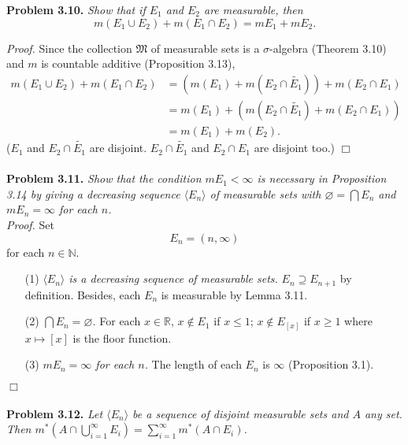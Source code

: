 \documentclass{article}
\begin{document}
\textbf{Problem 3.10.}
\emph{Show that if $E_1$ and $E_2$ are measurable, then
$$m(E_1 \cup E_2) + m(E_1 \cap E_2) = mE_1 + mE_2.$$}

\emph{Proof.}
Since the collection $\mathfrak{M}$ of measurable sets is a $\sigma$-algebra
(Theorem 3.10) and $m$ is countable additive (Proposition 3.13),
\begin{align*}
m(E_1 \cup E_2) + m(E_1 \cap E_2)
& = \left( m(E_1) + m(E_2 \cap \widetilde{E_1}) \right) + m(E_2 \cap E_1) \\
& = m(E_1) + \left( m(E_2 \cap \widetilde{E_1}) + m(E_2 \cap E_1) \right) \\
& = m(E_1) + m(E_2).
\end{align*}
($E_1$ and $E_2 \cap \widetilde{E_1}$ are disjoint.
$E_2 \cap \widetilde{E_1}$ and $E_2 \cap E_1$ are disjoint too.)
$\Box$ \\\\



\textbf{Problem 3.11.}
\emph{Show that the condition $mE_1 < \infty$ is necessary in Proposition 3.14 by
giving a decreasing sequence $\langle E_n \rangle$ of measurable sets with
$\varnothing = \bigcap E_n$ and $mE_n = \infty$ for each $n$.} \\

\emph{Proof.}
Set $$E_n = (n, \infty)$$ for each $n \in \mathbb{N}$.
\begin{enumerate}
\item[(1)]
\emph{$\langle E_n \rangle$ is a decreasing sequence of measurable sets.}
$E_n \supseteq E_{n+1}$ by definition.
Besides, each $E_n$ is measurable by Lemma 3.11.
\item[(2)]
\emph{$\bigcap E_n = \varnothing$.}
For each $x \in \mathbb{R}$, $x \notin E_1$ if $x \leq 1$;
$x \notin E_{[x]}$ if $x \geq 1$ where $x \mapsto [x]$ is the floor function.
\item[(3)]
\emph{$mE_n = \infty$ for each $n$.}
The length of each $E_n$ is $\infty$ (Proposition 3.1).
\end{enumerate}
$\Box$ \\\\



\textbf{Problem 3.12.}
\emph{Let $\langle E_n \rangle$ be a sequence of disjoint measurable sets and $A$ any set.
Then
$m^{*}\left( A \cap \bigcup_{i=1}^{\infty}E_i \right)
= \sum_{i=1}^{\infty} m^{*}(A \cap E_i)$.} \\
\end{document}
